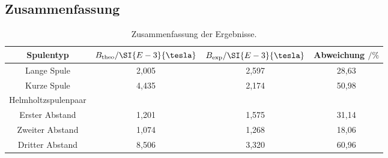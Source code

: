\subsection{Zusammenfassung}
\begin{table}[htbp]
	\centering
	\caption{Zusammenfassung der Ergebnisse.}
	\label{tab:Ergebnisse}
	\begin{tabular}{c c c c}
		\toprule
		Spulentyp & $B_\text{theo} / \SI{E-3}{\tesla}$ &  $B_\text{exp} / \SI{E-3}{\tesla}$ & Abweichung $ / \si{\percent}$\\
		\midrule
	    Lange Spule & 2,005 & 2,597 & 28,63 \\
	    Kurze Spule & 4,435 & 2,174 & 50,98 \\
	    \midrule 
	    Helmholtzspulenpaar
	     & & & \\
	    \midrule
	    Erster Abstand & 1,201 & 1,575 & 31,14 \\
	    Zweiter Abstand & 1,074 & 1,268 & 18,06 \\
	    Dritter Abstand & 8,506 & 3,320 & 60,96 \\
		\bottomrule
	\end{tabular}
\end{table}
